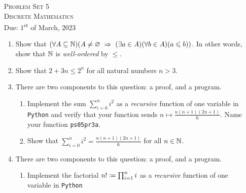 




\begin{center}
    \textsc{\huge Problem Set 5}\\
    \textsc{Discrete Mathematics}\\
    {\color{gruvred}Due: $1$\textsuperscript{st} of March, $2023$}
\end{center}

\begin{enumerate}
    \item
        Show that $\pn*{\forall A \subseteq \N}
                        \pn*{A \neq \emptyset \implies \pn*{\exists a \in A}\pn*{\forall b \in A}\pn*{a \leq b}}$.
        In other words, show that $\mathbb{N}$ is \emph{well-ordered} by $\leq$.
    \item
        Show that $2 + 3n \leq 2^n$ for all natural numbers $n > 3$.
    \item
        There are two components to this question: a proof, and a program.
        \begin{enumerate}
            \item
                Implement the sum $\sum_{i = 0}^{n}i^2$
                as a \emph{recursive} function of one variable in \texttt{Python}
                and verify that your function sends $n \mapsto \frac{n(n + 1)(2n + 1)}{6}$.
                Name your function \texttt{ps05pr3a}.
            \item
                Show that $\displaystyle \sum_{i = 0}^{n}i^2 = \frac{n(n + 1)(2n + 1)}{6}$
                for all $n \in \mathbb{N}$.
        \end{enumerate}
    \item
        There are two components to this question: a proof, and a program.
        \begin{enumerate}
            \item
                Implement the factorial $n! \coloneqq \prod_{i = 1}^{n}i$
                as a \emph{recursive} function of one variable in \texttt{Python}

\end{enumerate}
\end{enumerate}
